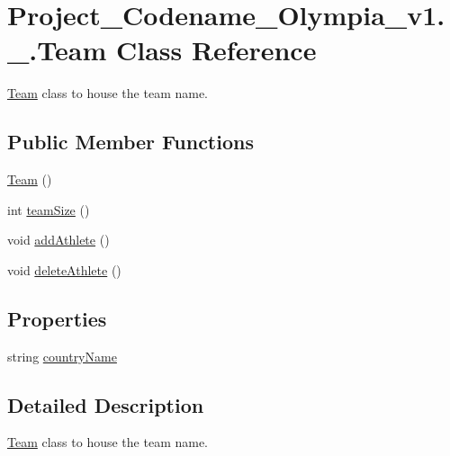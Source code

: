 \hypertarget{classProject__Codename__Olympia__v1_1_1__0_1_1Team}{}\section{Project\+\_\+\+Codename\+\_\+\+Olympia\+\_\+v1.\+\_.\+Team Class Reference}
\label{classProject__Codename__Olympia__v1_1_1__0_1_1Team}


\hyperlink{classProject__Codename__Olympia__v1_1_1__0_1_1Team}{Team} class to house the team name.  


\subsection*{Public Member Functions}
\begin{DoxyCompactItemize}
\item 
\hyperlink{classProject__Codename__Olympia__v1_1_1__0_1_1Team_a370f46a59abab44451339138a0bf56aa}{Team} ()
\item 
int \hyperlink{classProject__Codename__Olympia__v1_1_1__0_1_1Team_a952816965dd529a15593315d18e38afc}{team\+Size} ()
\item 
void \hyperlink{classProject__Codename__Olympia__v1_1_1__0_1_1Team_a2f6a8ccddb47c40e497252321bcda811}{add\+Athlete} ()
\item 
void \hyperlink{classProject__Codename__Olympia__v1_1_1__0_1_1Team_ad172848f51c93bc1dcd0edc4e478ab23}{delete\+Athlete} ()
\end{DoxyCompactItemize}
\subsection*{Properties}
\begin{DoxyCompactItemize}
\item 
string \hyperlink{classProject__Codename__Olympia__v1_1_1__0_1_1Team_ae9c37c693f3d3254986cbea43819c946}{country\+Name}
\end{DoxyCompactItemize}


\subsection{Detailed Description}
\hyperlink{classProject__Codename__Olympia__v1_1_1__0_1_1Team}{Team} class to house the team name. 

